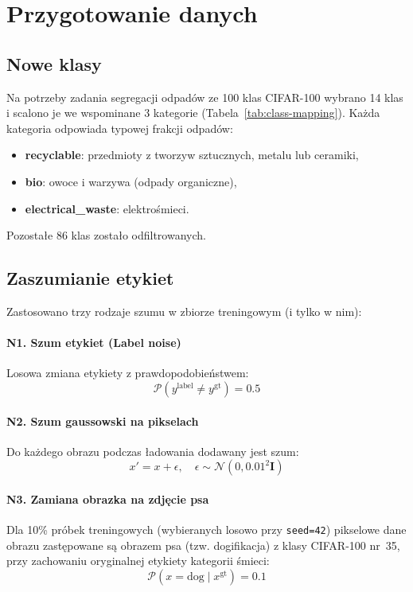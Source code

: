 \documentclass[12pt,twocolumn]{article}
\begin{document}
\section{Przygotowanie danych}
\label{sec:etap3}

\subsection{Nowe klasy}

Na potrzeby zadania segregacji odpadów ze 100 klas CIFAR-100 wybrano 14 klas
i scalono je we wspominane 3 kategorie (Tabela~\ref{tab:class-mapping}).
Każda kategoria odpowiada typowej frakcji odpadów:
\begin{itemize}
  \item \textbf{recyclable}: przedmioty z tworzyw sztucznych, metalu lub ceramiki,
  \item \textbf{bio}: owoce i warzywa (odpady organiczne),
  \item \textbf{electrical\_waste}: elektrośmieci.
\end{itemize}

Pozostałe 86 klas zostało odfiltrowanych.

\subsection{Zaszumianie etykiet}

Zastosowano trzy rodzaje szumu w zbiorze treningowym (i tylko w nim):

\paragraph{N1. Szum etykiet (Label noise)}
Losowa zmiana etykiety z prawdopodobieństwem:
\begin{equation}
  \mathcal{P}(y^{\text{label}} \neq y^{\text{gt}}) = 0.5
\end{equation}

\paragraph{N2. Szum gaussowski na pikselach}
Do każdego obrazu podczas ładowania dodawany jest szum:
\begin{equation}
  x' = x + \epsilon, \quad \epsilon \sim \mathcal{N}(0, 0.01^2 \mathbf{I})
\end{equation}

\paragraph{N3. Zamiana obrazka na zdjęcie psa}
Dla 10\% próbek treningowych (wybieranych losowo przy \texttt{seed=42})
pikselowe dane obrazu zastępowane są obrazem psa (tzw. dogifikacja) z klasy CIFAR-100 nr~35,
przy zachowaniu oryginalnej etykiety kategorii śmieci:
\begin{equation}
  \mathcal{P}(x = \text{dog} \mid x^{\text{gt}}) = 0.1
\end{equation}
\end{document}
